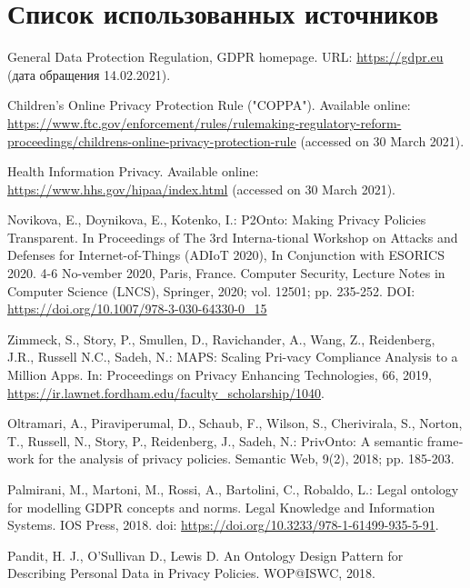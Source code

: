 \documentclass[../main]{subfiles}
\begin{document}
\newpage
{}
\section*{Список использованных источников}

\begin{english}
\begin{biblenum}

     General Data Protection Regulation, GDPR homepage. URL: \url{https://gdpr.eu} (дата обращения 14.02.2021).

     Children's Online Privacy Protection Rule ("COPPA"). Available online: \url{https://www.ftc.gov/enforcement/rules/rulemaking-regulatory-reform-proceedings/childrens-online-privacy-protection-rule} (accessed on 30 March 2021). 

     Health Information Privacy. Available online: \url{https://www.hhs.gov/hipaa/index.html} (accessed on 30 March 2021).

     Novikova, E., Doynikova, E., Kotenko, I.: P2Onto: Making Privacy Policies Transparent. In Proceedings of The 3rd Interna-tional Workshop on Attacks and Defenses for Internet-of-Things (ADIoT 2020), In Conjunction with ESORICS 2020. 4-6 No-vember 2020, Paris, France. Computer Security, Lecture Notes in Computer Science (LNCS), Springer, 2020; vol. 12501; pp. 235-252. DOI: \url{https://doi.org/10.1007/978-3-030-64330-0_15}
    
     Zimmeck, S., Story, P., Smullen, D., Ravichander, A., Wang, Z., Reidenberg, J.R., Russell N.C., Sadeh, N.: MAPS: Scaling Pri-vacy Compliance Analysis to a Million Apps. In: Proceedings on Privacy Enhancing Technologies, 66, 2019, \url{https://ir.lawnet.fordham.edu/faculty_scholarship/1040}.

     Oltramari, A., Piraviperumal, D., Schaub, F., Wilson, S., Cherivirala, S., Norton, T., Russell, N., Story, P., Reidenberg, J., Sadeh, N.: PrivOnto: A semantic framework for the analysis of privacy policies. Semantic Web, 9(2), 2018; pp. 185-203.

     Palmirani, M., Martoni, M., Rossi, A., Bartolini, C., Robaldo, L.: Legal ontology for modelling GDPR concepts and norms. Legal Knowledge and Information Systems. IOS Press, 2018. doi: \url{https://doi.org/10.3233/978-1-61499-935-5-91}.

     Pandit, H. J., O’Sullivan D., Lewis D. An Ontology Design Pattern for Describing Personal Data in Privacy Policies. WOP@ISWC, 2018.


\end{biblenum}
\end{english}
\end{document}
